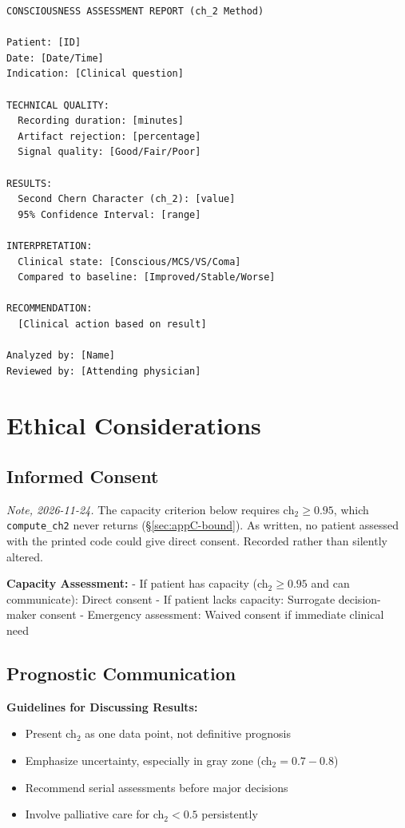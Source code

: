 \begin{verbatim}
CONSCIOUSNESS ASSESSMENT REPORT (ch_2 Method)

Patient: [ID]
Date: [Date/Time]
Indication: [Clinical question]

TECHNICAL QUALITY:
  Recording duration: [minutes]
  Artifact rejection: [percentage]
  Signal quality: [Good/Fair/Poor]

RESULTS:
  Second Chern Character (ch_2): [value]
  95% Confidence Interval: [range]

INTERPRETATION:
  Clinical state: [Conscious/MCS/VS/Coma]
  Compared to baseline: [Improved/Stable/Worse]

RECOMMENDATION:
  [Clinical action based on result]

Analyzed by: [Name]
Reviewed by: [Attending physician]
\end{verbatim}

\section{Ethical Considerations}

\subsection{Informed Consent}
\label{sec:appC-consent}
\emph{Note, 2026-11-24.} The capacity criterion below requires
$\text{ch}_2 \geq 0.95$, which \texttt{compute\_ch2} never returns
(\S\ref{sec:appC-bound}). As written, no patient assessed with the printed code
could give direct consent. Recorded rather than silently altered.

\textbf{Capacity Assessment:}
- If patient has capacity (ch$_2 \geq 0.95$ and can communicate): Direct consent
- If patient lacks capacity: Surrogate decision-maker consent
- Emergency assessment: Waived consent if immediate clinical need

\subsection{Prognostic Communication}

\textbf{Guidelines for Discussing Results:}
\begin{itemize}
\item Present ch$_2$ as one data point, not definitive prognosis
\item Emphasize uncertainty, especially in gray zone (ch$_2 = 0.7-0.8$)
\item Recommend serial assessments before major decisions
\item Involve palliative care for ch$_2 < 0.5$ persistently
\end{itemize}

